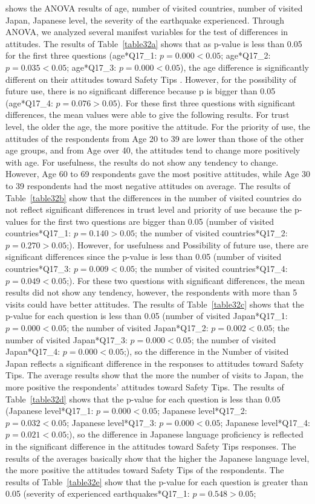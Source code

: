  shows the ANOVA results of age, number of visited countries, number of visited Japan, Japanese level, the severity of the earthquake experienced. Through ANOVA, we analyzed several manifest variables for the test of differences in attitudes. The results of Table~\ref{table32a} shows that as p-value is less than 0.05 for the first three questions (age*Q17\_1: $p=0.000<0.05$; age*Q17\_2: $p=0.035<0.05$; age*Q17\_3: $p=0.000<0.05$), the age difference is significantly different on their attitudes toward Safety Tips . However, for the possibility of future use, there is no significant difference because p is bigger than 0.05 (age*Q17\_4: $p=0.076>0.05$). For these first three questions with significant differences, the mean values were able to give the following results. For trust level, the older the age, the more positive the attitude. For the priority of use, the attitudes of the respondents from Age 20 to 39 are lower than those of the other age groups, and from Age over 40, the attitudes tend to change more positively with age. For usefulness, the results do not show any tendency to change. However, Age 60 to 69 respondents gave the most positive attitudes, while Age 30 to 39 respondents had the most negative attitudes on average. The results of Table~\ref{table32b} show that the differences in the number of visited countries do not reflect significant differences in trust level and priority of use because the p-values for the first two questions are bigger than 0.05 (number of visited countries*Q17\_1: $p=0.140>0.05$; the number of visited countries*Q17\_2: $p=0.270>0.05$;). However, for usefulness and Possibility of future use, there are significant differences since the p-value is less than 0.05 (number of visited countries*Q17\_3: $p=0.009<0.05$; the number of visited countries*Q17\_4: $p=0.049<0.05$;). For these two questions with significant differences, the mean results did not show any tendency, however, the respondents with more than 5 visits could have better attitudes. The results of Table~\ref{table32c} shows that the p-value for each question is less than 0.05 (number of visited Japan*Q17\_1: $p=0.000<0.05$; the number of visited Japan*Q17\_2: $p=0.002<0.05$; the number of visited Japan*Q17\_3: $p=0.000<0.05$; the number of visited Japan*Q17\_4: $p=0.000<0.05$;), so the difference in the Number of visited Japan reflects a significant difference in the responses to attitudes toward Safety Tips. The average results show that the more the number of visits to Japan, the more positive the respondents' attitudes toward Safety Tips. The results of Table~\ref{table32d} shows that the p-value for each question is less than 0.05 (Japanese level*Q17\_1: $p=0.000<0.05$; Japanese level*Q17\_2: $p=0.032<0.05$; Japanese level*Q17\_3: $p=0.000<0.05$; Japanese level*Q17\_4: $p=0.021<0.05$;), so the difference in Japanese language proficiency is reflected in the significant difference in the attitudes toward Safety Tips responses. The results of the averages basically show that the higher the Japanese language level, the more positive the attitudes toward Safety Tips of the respondents. The results of Table~\ref{table32e} show that the p-value for each question is greater than 0.05 (severity of experienced earthquakes*Q17\_1: $p=0.548>0.05$; 
